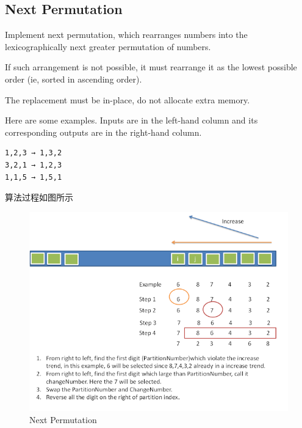 \documentclass[12pt]{book}
\begin{document}
\subsection{Next Permutation}
\label{sec-21-2-5}
Implement next permutation, which rearranges numbers into the lexicographically next greater permutation of numbers.

If such arrangement is not possible, it must rearrange it as the lowest possible order (ie, sorted in ascending order).

The replacement must be in-place, do not allocate extra memory.

Here are some examples. Inputs are in the left-hand column and its
corresponding outputs are in the right-hand column.
\lstset{language=java,label= ,caption= ,numbers=none}
\begin{lstlisting}
1,2,3 → 1,3,2
3,2,1 → 1,2,3
1,1,5 → 1,5,1
\end{lstlisting}

算法过程如图所示

\begin{figure}[htb]
\centering
\includegraphics[width=.9\linewidth]{./pic/nextPermutation.png}
\caption{Next Permutation}
\end{figure}
\end{document}
